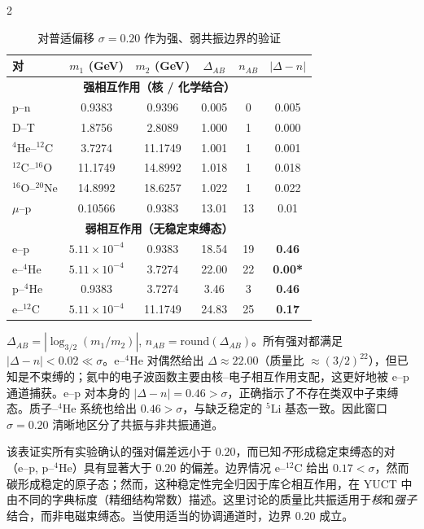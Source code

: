 \documentclass[11pt,a4paper]{article}
\begin{document}
\begin{multicols}{2}
		\begin{table}[H]
			\centering
			\caption{对普适偏移 \(\sigma = 0.20\) 作为强、弱共振边界的验证}
			\label{tab:sigma_validation}
			\small
			\begin{tabular}{l c c c c c}
				\toprule
				对 & $m_1$ (GeV) & $m_2$ (GeV) & $\Delta_{AB}$ & $n_{AB}$ & $|\Delta - n|$ \\
				\midrule
				\multicolumn{6}{c}{\textbf{强相互作用（核 / 化学结合）}} \\
				p--n           & 0.9383 & 0.9396 & 0.005  & 0 & 0.005 \\
				D--T           & 1.8756 & 2.8089 & 1.000  & 1 & 0.000 \\
				$^4$He--$^{12}$C  & 3.7274 & 11.1749 & 1.001  & 1 & 0.001 \\
				$^{12}$C--$^{16}$O & 11.1749& 14.8992 & 1.018  & 1 & 0.018 \\
				$^{16}$O--$^{20}$Ne& 14.8992& 18.6257 & 1.022  & 1 & 0.022 \\
				$\mu$--p        & 0.10566& 0.9383 & 13.01  &13 & 0.01  \\
				\midrule
				\multicolumn{6}{c}{\textbf{弱相互作用（无稳定束缚态）}} \\
				e--p           & $5.11\times10^{-4}$ & 0.9383 & 18.54 & 19 & \textbf{0.46} \\
				e--$^4$He      & $5.11\times10^{-4}$ & 3.7274 & 22.00 & 22 & \textbf{0.00*} \\
				p--$^4$He      & 0.9383 & 3.7274 & 3.46  & 3  & \textbf{0.46} \\
				e--$^{12}$C    & $5.11\times10^{-4}$ & 11.1749& 24.83 & 25 & \textbf{0.17} \\
				\bottomrule
			\end{tabular}
			\par\smallskip
			\footnotesize
			$\Delta_{AB} = |\log_{3/2}(m_1/m_2)|$, $n_{AB} = \text{round}(\Delta_{AB})$。所有强对都满足 $|\Delta - n| < 0.02 \ll \sigma$。e--$^4$He 对偶然给出 $\Delta \approx 22.00$（质量比 $\approx (3/2)^{22}$），但已知是不束缚的；氦中的电子波函数主要由核–电子相互作用支配，这更好地被 e--p 通道捕获。e--p 对本身的 $|\Delta - n| = 0.46 > \sigma$，正确指示了不存在类双中子束缚态。质子–$^4$He 系统也给出 $0.46 > \sigma$，与缺乏稳定的 $^5$Li 基态一致。因此窗口 $\sigma = 0.20$ 清晰地区分了共振与非共振通道。
		\end{table}
		
		该表证实所有实验确认的强对偏差远小于 $0.20$，而已知\textit{不}形成稳定束缚态的对（e--p, p--$^4$He）具有显著大于 $0.20$ 的偏差。边界情况 e--$^{12}$C 给出 $0.17 < \sigma$，然而碳形成稳定的原子态；然而，这种稳定性完全归因于库仑相互作用，在 YUCT 中由不同的字典标度（精细结构常数）描述。这里讨论的质量比共振适用于\textit{核}和\textit{强子}结合，而非电磁束缚态。当使用适当的协调通道时，边界 $0.20$ 成立。
		

\end{multicols}
\end{document}
